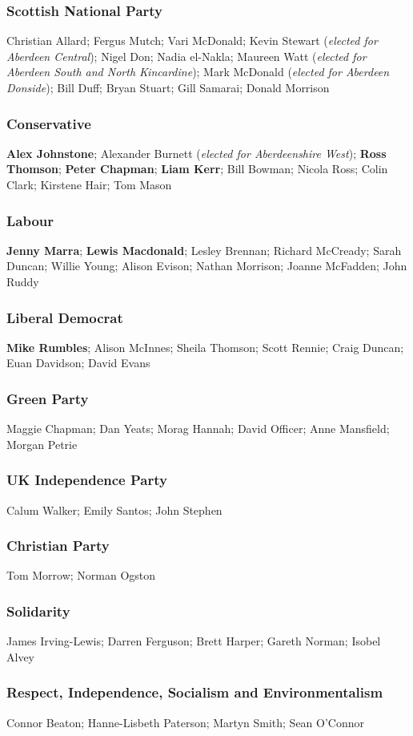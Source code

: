 \begin{resultsiii}
\subsubsection*{Scottish National Party}
Christian Allard; Fergus Mutch; Vari McDonald; Kevin Stewart (\emph{elected for Aberdeen Central}); Nigel Don; Nadia el-Nakla; Maureen Watt (\emph{elected for Aberdeen South and North Kincardine}); Mark McDonald (\emph{elected for Aberdeen Donside}); Bill Duff; Bryan Stuart; Gill Samarai; Donald Morrison
\subsubsection*{Conservative}
\textbf{Alex Johnstone}; Alexander Burnett (\emph{elected for Aberdeenshire West}); \textbf{Ross Thomson}; \textbf{Peter Chapman}; \textbf{Liam Kerr}; Bill Bowman; Nicola Ross; Colin Clark; Kirstene Hair; Tom Mason
\subsubsection*{Labour}
\textbf{Jenny Marra}; \textbf{Lewis Macdonald}; Lesley Brennan; Richard McCready; Sarah Duncan; Willie Young; Alison Evison; Nathan Morrison; Joanne McFadden; John Ruddy
\subsubsection*{Liberal Democrat}
\textbf{Mike Rumbles}; Alison McInnes; Sheila Thomson; Scott Rennie; Craig Duncan; Euan Davidson; David Evans
\subsubsection*{Green Party}
Maggie Chapman; Dan Yeats; Morag Hannah; David Officer; Anne Mansfield; Morgan Petrie 
\subsubsection*{UK Independence Party}
Calum Walker; Emily Santos; John Stephen
\subsubsection*{Christian Party}
Tom Morrow; Norman Ogston
\subsubsection*{Solidarity}
James Irving-Lewis; Darren Ferguson; Brett Harper; Gareth Norman; Isobel Alvey
\subsubsection*{Respect, Independence, Socialism and Environmentalism}
Connor Beaton; Hanne-Lisbeth Paterson; Martyn Smith; Sean O'Connor
\end{resultsiii}

